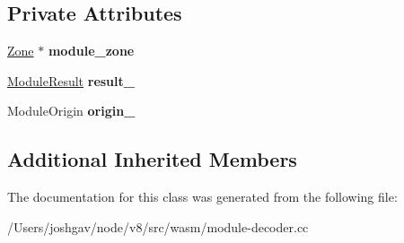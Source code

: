 \subsection*{Private Attributes}
\begin{DoxyCompactItemize}
\item 
\hyperlink{classv8_1_1internal_1_1_zone}{Zone} $\ast$ {\bfseries module\+\_\+zone}\hypertarget{classv8_1_1internal_1_1wasm_1_1_module_decoder_a27cd48d1204a8d90536698132cb75960}{}\label{classv8_1_1internal_1_1wasm_1_1_module_decoder_a27cd48d1204a8d90536698132cb75960}

\item 
\hyperlink{structv8_1_1internal_1_1wasm_1_1_result}{Module\+Result} {\bfseries result\+\_\+}\hypertarget{classv8_1_1internal_1_1wasm_1_1_module_decoder_ad96490ee4ec5d5906a1f47f3f36c4bf6}{}\label{classv8_1_1internal_1_1wasm_1_1_module_decoder_ad96490ee4ec5d5906a1f47f3f36c4bf6}

\item 
Module\+Origin {\bfseries origin\+\_\+}\hypertarget{classv8_1_1internal_1_1wasm_1_1_module_decoder_a9c25d87f23efead4883879781490af3e}{}\label{classv8_1_1internal_1_1wasm_1_1_module_decoder_a9c25d87f23efead4883879781490af3e}

\end{DoxyCompactItemize}
\subsection*{Additional Inherited Members}


The documentation for this class was generated from the following file\+:\begin{DoxyCompactItemize}
\item 
/\+Users/joshgav/node/v8/src/wasm/module-\/decoder.\+cc\end{DoxyCompactItemize}
